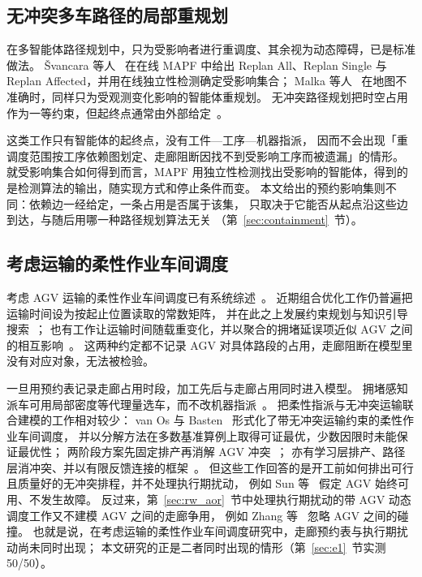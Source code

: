 \documentclass[manuscript,screen,review]{acmart}
\newcommand{\NPairs}{50}
\newcommand{\PassMiss}{\NPairs/\NPairs}      %
\begin{document}
\subsection{无冲突多车路径的局部重规划}
\label{sec:rw_mapf}

在多智能体路径规划中，只为受影响者进行重调度、其余视为动态障碍，已是标准做法。
Švancara 等人~\cite{svancara2019online} 在在线 MAPF 中给出
Replan All、Replan Single 与 Replan Affected，并用在线独立性检测确定受影响集合；
Malka 等人~\cite{malka2024online} 在地图不准确时，同样只为受观测变化影响的智能体重规划。
无冲突路径规划把时空占用作为一等约束，但起终点通常由外部给定~\cite{zhang2024guidance}。

这类工作只有智能体的起终点，没有工件—工序—机器指派，
因而不会出现「重调度范围按工序依赖图划定、走廊阻断因找不到受影响工序而被遗漏」的情形。
就受影响集合如何得到而言，MAPF 用独立性检测找出受影响的智能体，得到的是检测算法的输出，随实现方式和停止条件而变。
本文给出的预约影响集则不同：依赖边一经给定，一条占用是否属于该集，
只取决于它能否从起点沿这些边到达，与随后用哪一种路径规划算法无关
（第~\ref{sec:containment}~节）。

\subsection{考虑运输的柔性作业车间调度}
\label{sec:rw_position}

考虑 AGV 运输的柔性作业车间调度已有系统综述~\cite{xin2025review}。
近期组合优化工作仍普遍把运输时间设为按起止位置读取的常数矩阵，
并在此之上发展约束规划与知识引导搜索~\cite{meng2025cp,qin2026knowledge}；
也有工作让运输时间随载重变化，并以聚合的拥堵延误项近似 AGV 之间的相互影响~\cite{jafarian2026integrated}。
这两种约定都不记录 AGV 对具体路段的占用，走廊阻断在模型里没有对应对象，无法被检验。

一旦用预约表记录走廊占用时段，加工先后与走廊占用同时进入模型。
拥堵感知派车可用局部密度等代理量选车，而不改机器指派~\cite{kim2026congestion}。
把柔性指派与无冲突运输联合建模的工作相对较少：
van Os 与 Basten~\cite{vanos2026exact} 形式化了带无冲突运输约束的柔性作业车间调度，
并以分解方法在多数基准算例上取得可证最优，少数因限时未能保证最优性；
两阶段方案先固定排产再消解 AGV 冲突~\cite{sun2023integrated}；
亦有学习层排产、路径层消冲突、并以有限反馈连接的框架~\cite{li2026framework}。
但这些工作回答的是开工前如何排出可行且质量好的无冲突排程，并不处理执行期扰动，
例如 Sun 等~\cite{sun2023integrated} 假定 AGV 始终可用、不发生故障。
反过来，第~\ref{sec:rw_aor}~节中处理执行期扰动的带 AGV 动态调度工作又不建模 AGV 之间的走廊争用，
例如 Zhang 等~\cite{zhang2023energy} 忽略 AGV 之间的碰撞。
也就是说，在考虑运输的柔性作业车间调度研究中，走廊预约表与执行期扰动尚未同时出现；
本文研究的正是二者同时出现的情形（第~\ref{sec:e1}~节实测 \PassMiss）。
\end{document}
